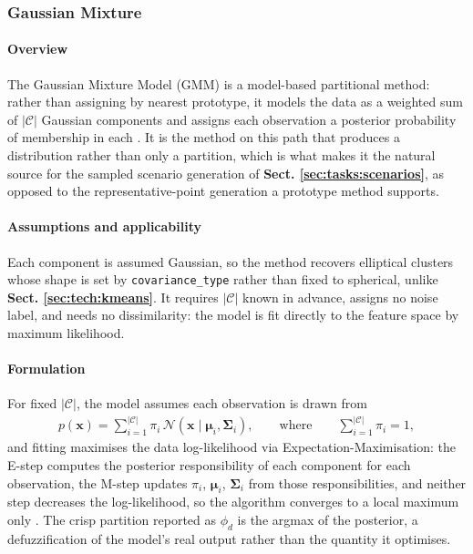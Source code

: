 \subsubsection{Gaussian Mixture}
\label{sec:tech:gmm}

\paragraph{Overview}
\label{sec:tech:gmm:overview}
The Gaussian Mixture Model (GMM) is a model-based partitional method: rather than assigning by nearest prototype, it models the data as a weighted sum of $|\mathcal C|$ Gaussian components and assigns each observation a posterior probability of membership in each \cite{ref_5}. It is the method on this path that produces a distribution rather than only a partition, which is what makes it the natural source for the sampled scenario generation of \textbf{Sect. \ref{sec:tasks:scenarios}}, as opposed to the representative-point generation a prototype method supports.

\paragraph{Assumptions and applicability}
\label{sec:tech:gmm:assumptions}
Each component is assumed Gaussian, so the method recovers elliptical clusters whose shape is set by \texttt{covariance\_type} rather than fixed to spherical, unlike \textbf{Sect. \ref{sec:tech:kmeans}}. It requires $|\mathcal C|$ known in advance, assigns no noise label, and needs no dissimilarity: the model is fit directly to the feature space by maximum likelihood.

\paragraph{Formulation}
\label{sec:tech:gmm:formulation}
For fixed $|\mathcal C|$, the model assumes each observation is drawn from
\begin{align}
    p(\mathbf x) = \sum_{i = 1}^{|\mathcal C|} \pi_i \, \mathcal N(\mathbf x \mid \boldsymbol \mu_i, \boldsymbol \Sigma_i),
    \qquad \text{where} \qquad
    \sum_{i = 1}^{|\mathcal C|} \pi_i = 1,
\end{align}
and fitting maximises the data log-likelihood via Expectation-Maximisation: the E-step computes the posterior responsibility of each component for each observation, the M-step updates $\pi_i$, $\boldsymbol \mu_i$, $\boldsymbol \Sigma_i$ from those responsibilities, and neither step decreases the log-likelihood, so the algorithm converges to a local maximum only \cite{ref_5}. The crisp partition reported as $\phi_d$ is the argmax of the posterior, a defuzzification of the model's real output rather than the quantity it optimises.

